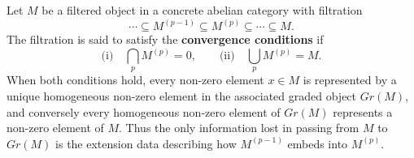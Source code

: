 Let $M$ be a filtered object in a concrete abelian category with filtration
$$
\cdots \subseteq M^{(p-1)} \subseteq M^{(p)} \subseteq \cdots \subseteq M.
$$
The filtration is said to satisfy the \textbf{convergence conditions} if
$$
\text{(i)} \quad \bigcap_{p} M^{(p)} = 0, \qquad
\text{(ii)} \quad \bigcup_{p} M^{(p)} = M.
$$
When both conditions hold, every non-zero element $x \in M$ is represented by a unique homogeneous non-zero element in the associated graded object $Gr(M)$, and conversely every homogeneous non-zero element of $Gr(M)$ represents a non-zero element of $M$. Thus the only information lost in passing from $M$ to $Gr(M)$ is the extension data describing how $M^{(p-1)}$ embeds into $M^{(p)}$.
